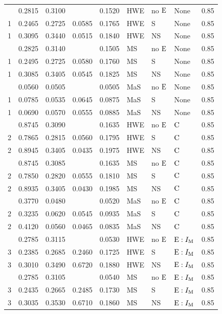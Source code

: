 \begin{longtable}[t]{lllllllll}
\endfoot
\bottomrule
\endlastfoot
1 & 0.2815 & 0.3100 &  & 0.1520 & HWE & no ${\rm E}$ & None & 0.85\\
1 & 0.2465 & 0.2725 & 0.0585 & 0.1765 & HWE & S & None & 0.85\\
1 & 0.3095 & 0.3440 & 0.0515 & 0.1840 & HWE & NS & None & 0.85\\
\addlinespace
1 & 0.2825 & 0.3140 &  & 0.1505 & MS & no ${\rm E}$ & None & 0.85\\
1 & 0.2495 & 0.2725 & 0.0580 & 0.1760 & MS & S & None & 0.85\\
1 & 0.3085 & 0.3405 & 0.0545 & 0.1825 & MS & NS & None & 0.85\\
\addlinespace
1 & 0.0560 & 0.0505 &  & 0.0505 & MaS & no ${\rm E}$ & None & 0.85\\
1 & 0.0785 & 0.0535 & 0.0645 & 0.0875 & MaS & S & None & 0.85\\
1 & 0.0690 & 0.0570 & 0.0555 & 0.0885 & MaS & NS & None & 0.85\\
\addlinespace
2 & 0.8745 & 0.3090 &  & 0.1635 & HWE & no ${\rm E}$ & ${\rm C}$ & 0.85\\
2 & 0.7865 & 0.2815 & 0.0560 & 0.1795 & HWE & S & ${\rm C}$ & 0.85\\
2 & 0.8945 & 0.3405 & 0.0435 & 0.1975 & HWE & NS & ${\rm C}$ & 0.85\\
\addlinespace
2 & 0.8745 & 0.3085 &  & 0.1635 & MS & no ${\rm E}$ & ${\rm C}$ & 0.85\\
2 & 0.7850 & 0.2820 & 0.0555 & 0.1810 & MS & S & ${\rm C}$ & 0.85\\
2 & 0.8935 & 0.3405 & 0.0430 & 0.1985 & MS & NS & ${\rm C}$ & 0.85\\
\addlinespace
2 & 0.3770 & 0.0480 &  & 0.0520 & MaS & no ${\rm E}$ & ${\rm C}$ & 0.85\\
2 & 0.3235 & 0.0620 & 0.0545 & 0.0935 & MaS & S & ${\rm C}$ & 0.85\\
2 & 0.4120 & 0.0560 & 0.0465 & 0.0835 & MaS & NS & ${\rm C}$ & 0.85\\
\addlinespace
3 & 0.2785 & 0.3115 &  & 0.0530 & HWE & no ${\rm E}$ & ${\rm E}:I_{{\rm M}}$ & 0.85\\
3 & 0.2385 & 0.2685 & 0.2460 & 0.1725 & HWE & S & ${\rm E}:I_{{\rm M}}$ & 0.85\\
3 & 0.3010 & 0.3490 & 0.6720 & 0.1880 & HWE & NS & ${\rm E}:I_{{\rm M}}$ & 0.85\\
\addlinespace
3 & 0.2785 & 0.3105 &  & 0.0540 & MS & no ${\rm E}$ & ${\rm E}:I_{{\rm M}}$ & 0.85\\
3 & 0.2435 & 0.2665 & 0.2485 & 0.1730 & MS & S & ${\rm E}:I_{{\rm M}}$ & 0.85\\
3 & 0.3035 & 0.3530 & 0.6710 & 0.1860 & MS & NS & ${\rm E}:I_{{\rm M}}$ & 0.85\\

\end{longtable}
